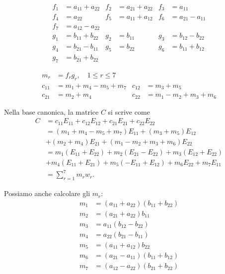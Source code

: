 \begin{align*}
	f_1 & = a_{11} + a_{22} & f_2 & = a_{21} + a_{22} & f_3 & = a_{11}          \\
	f_4 & = a_{22}          & f_5 & = a_{11} + a_{12} & f_6 & = a_{21} - a_{11} \\
	f_7 & = a_{12} - a_{22}                                                     \\
	g_1 & = b_{11} + b_{22} & g_2 & = b_{11}          & g_3 & = b_{12} - b_{22} \\
	g_4 & = b_{21} - b_{11} & g_5 & = b_{22}          & g_6 & = b_{11} + b_{12} \\
	g_7 & = b_{21} + b_{22}
\end{align*}

\begin{equation}
	\begin{aligned}
		m_r    & = f_rg_r, \quad 1 \le r \le 7                                    \\
		c_{11} & = m_1 + m_4 - m_5 + m_7       & c_{12} & = m_3 + m_5             \\
		c_{21} & = m_2 + m_4                   & c_{22} & = m_1 - m_2 + m_3 + m_6
	\end{aligned}
\end{equation}

Nella base canonica, la matrice $ C $ si scrive come
\begin{equation*}
	\begin{aligned}
		C & = c_{11}E_{11} + c_{12}E_{12} + c_{21}E_{21} + c_{22}E_{22}            \\
		  & = (m_1 +m_4-m_5 +m_7)E_{11} + (m_3+m_5)E_{12}                          \\
		  & + (m_2 + m_4)E_{21} + (m_1 - m_2 + m_3
		+m_6)E_{22}                                                                \\
		  & = m_1(E_{11} + E_{22}) + m_2(E_{21} - E_{22}) + m_3(E_{12} + E_{22})   \\
		  & + m_4(E_{11} + E_{21}) + m_5(-E_{11} + E_{12}) + m_6E_{22} + m_7E_{11} \\
		  & = \sum_{r=1}^7 m_{r}w_{r}.
	\end{aligned}
\end{equation*}

Possiamo anche calcolare gli $ m_{r} $:
\begin{equation*}
	\begin{aligned}
		m_1 & = (a_{11} + a_{22})(b_{11} + b_{22}) \\
		m_2 & = (a_{21} + a_{22})b_{11}            \\
		m_3 & = a_{11} (b_{12} - b_{22})           \\
		m_4 & = a_{22} (b_{21} - b_{11})           \\
		m_5 & = (a_{11} + a_{12})b_{22}            \\
		m_6 & = (a_{21} -a_{11})(b_{11} + b_{12})  \\
		m_7 & = (a_{12} - a_{22})(b_{21} + b_{22})
	\end{aligned}
\end{equation*}

